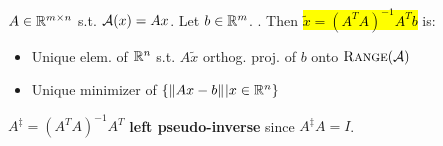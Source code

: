 \begin{Theorem}
$A\in\mathbb R^{m\times n}$ s.t. $\mathcal{A}(x)=Ax$. Let $b\in\mathbb R^m$. . Then \hl{$\widetilde x=(A^TA)^{-1}A^Tb$} is:
\begin{itemize}[leftmargin=4mm]
  \item Unique elem. of $\mathbb R^n$ s.t. $A\widetilde x$ orthog. proj. of $b$ onto $\textsc{Range}(\mathcal{A})$
  \item Unique minimizer of $\{\|Ax-b\|_{}|x\in\mathbb R^n\}$
\end{itemize}
\begin{Definition}
$A^\ddagger=(A^TA)^{-1}A^T$ \textbf{left pseudo-inverse} since $A^\ddagger A=I$.
\end{Definition}
\end{Theorem}